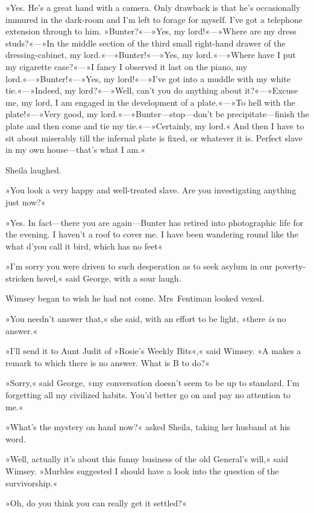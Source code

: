 »Yes. He's a great hand with a camera. Only drawback is that he's occasionally immured in the dark-room and I'm left to forage for myself. I've got a telephone extension through to him. »Bunter?«—»Yes, my lord!«—»Where are my dress studs?«—»In the middle section of the third small right-hand drawer of the dressing-cabinet, my lord.«—»Bunter!«—»Yes, my lord.«—»Where have I put my cigarette case?«—»I fancy I observed it last on the piano, my lord.«—»Bunter!«—»Yes, my lord!«—»I've got into a muddle with my white tie.«—»Indeed, my lord?«—»Well, can't you do anything about it?«—»Excuse me, my lord, I am engaged in the development of a plate.«—»To hell with the plate!«—»Very good, my lord.«—»Bunter—stop—don't be precipitate—finish the plate and then come and tie my tie.«—»Certainly, my lord.« And then I have to sit about miserably till the infernal plate is fixed, or whatever it is. Perfect slave in my own house—that's what I am.«

Sheila laughed.

»You look a very happy and well-treated slave. Are you investigating anything just now?«

»Yes. In fact—there you are again—Bunter has retired into photographic life for the evening. I haven't a roof to cover me. I have been wandering round like the what d'you call it bird, which has no feet\longdash«

»I'm sorry you were driven to such desperation as to seek asylum in our poverty-stricken hovel,« said George, with a sour laugh.

Wimsey began to wish he had not come. Mrs~Fentiman looked vexed.

»You needn't answer that,« she said, with an effort to be light, »there \textit{is} no answer.«

»I'll send it to Aunt Judit of »Rosie's Weekly Bits«,« said Wimsey. »A makes a remark to which there is no answer. What is B to do?«

»Sorry,« said George, »my conversation doesn't seem to be up to standard. I'm forgetting all my civilized habits. You'd better go on and pay no attention to me.«

»What's the mystery on hand now?« asked Sheila, taking her husband at his word.

»Well, actually it's about this funny business of the old General's will,« said Wimsey. »Murbles suggested I should have a look into the question of the survivorship.«

»Oh, do you think you can really get it settled?«


